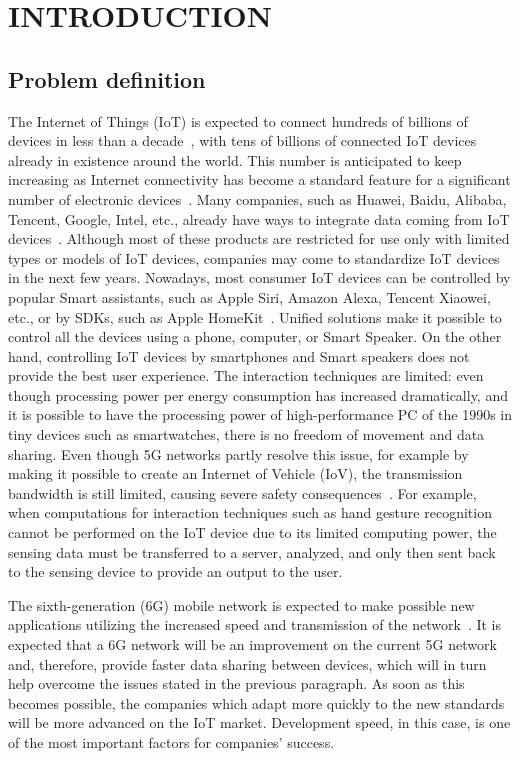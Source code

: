 
\chapter{\MakeUppercase{Introduction}}

\section{Problem definition}

The Internet of Things (IoT) is expected to connect hundreds of billions of devices in less than a decade~\cite{simiscuka_synchronisation_2018}, with tens of billions of connected IoT devices already in existence around the world. This number is anticipated to keep increasing as Internet connectivity has become a standard feature for a significant number of electronic devices~\cite{hu_virtual_2021}. Many companies, such as Huawei, Baidu, Alibaba, Tencent, Google, Intel, etc., already have ways to integrate data coming from IoT devices~\cite{perera}. Although most of these products are restricted for use only with limited types or models of IoT devices, companies may come to standardize IoT devices in the next few years. Nowadays, most consumer IoT devices can be controlled by popular Smart assistants, such as Apple Siri, Amazon Alexa, Tencent Xiaowei, etc., or by SDKs, such as Apple HomeKit~\cite{perera}. Unified solutions make it possible to control all the devices using a phone, computer, or Smart Speaker.
On the other hand, controlling IoT devices by smartphones and Smart speakers does not provide the best user experience. The interaction techniques are limited: even though processing power per energy consumption has increased dramatically, and it is possible to have the processing power of high-performance PC of the 1990s in tiny devices such as smartwatches, there is no freedom of movement and data sharing. Even though 5G networks partly resolve this issue, for example by making it possible to create an Internet of Vehicle (IoV), the transmission bandwidth is still limited, causing severe safety consequences~\cite{hu_virtual_2021}. For example, when computations for interaction techniques such as hand gesture recognition cannot be performed on the IoT device due to its limited computing power, the sensing data must be transferred to a server, analyzed, and only then sent back to the sensing device to provide an output to the user.

The sixth-generation (6G) mobile network is expected to make possible new applications utilizing the increased speed and transmission of the network~\cite{huang_survey_2019, liao_information-centric_2021}. It is expected that a 6G network will be an improvement on the current 5G network and, therefore, provide faster data sharing between devices, which will in turn help overcome the issues stated in the previous paragraph. As soon as this becomes possible, the companies which adapt more quickly to the new standards will be more advanced on the IoT market. Development speed, in this case, is one of the most important factors for companies' success.

